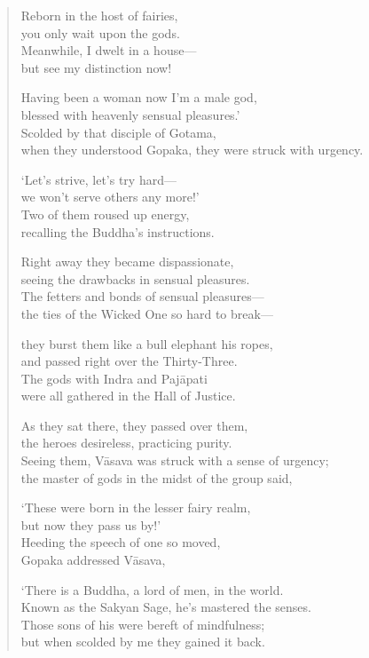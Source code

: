 \documentclass[12pt,openany]{book}%
\begin{document}
\begin{verse}
Reborn in the host of fairies, \\
you only wait upon the gods. \\
Meanwhile, I dwelt in a house—\\
but see my distinction now! 

Having been a woman now I’m a male god, \\
blessed with heavenly sensual pleasures.’ \\
Scolded by that disciple of Gotama, \\
when they understood Gopaka, they were struck with urgency. 

‘Let’s strive, let’s try hard—\\
we won’t serve others any more!’ \\
Two of them roused up energy, \\
recalling the Buddha’s instructions. 

Right away they became dispassionate, \\
seeing the drawbacks in sensual pleasures. \\
The fetters and bonds of sensual pleasures—\\
the ties of the Wicked One so hard to break—

they burst them like a bull elephant his ropes, \\
and passed right over the Thirty-Three. \\
The gods with Indra and \textsanskrit{Pajāpati} \\
were all gathered in the Hall of Justice. 

As they sat there, they passed over them, \\
the heroes desireless, practicing purity. \\
Seeing them, \textsanskrit{Vāsava} was struck with a sense of urgency; \\
the master of gods in the midst of the group said, 

‘These were born in the lesser fairy realm, \\
but now they pass us by!’ \\
Heeding the speech of one so moved, \\
Gopaka addressed \textsanskrit{Vāsava}, 

‘There is a Buddha, a lord of men, in the world. \\
Known as the Sakyan Sage, he’s mastered the senses. \\
Those sons of his were bereft of mindfulness; \\
but when scolded by me they gained it back. 


\end{verse}
\end{document}
